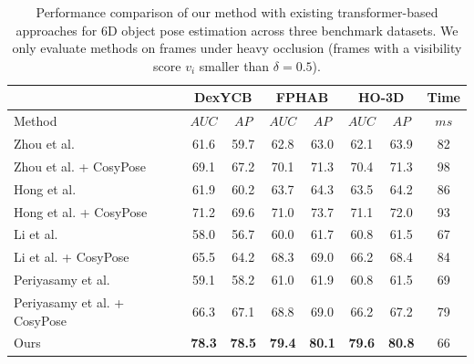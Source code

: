 \begin{table}[h]
\caption{Performance comparison of our method with existing transformer-based approaches for 6D object pose estimation across three benchmark datasets. We only evaluate methods on frames under heavy occlusion (frames with a visibility score \( v_i \) smaller than \( \delta = 0.5 \)).}
\label{tab:Transformer-Based}
\begin{center}
\begin{tabular}{l c c c c c c c} 
\hline
& \multicolumn{2}{c}{DexYCB} & \multicolumn{2}{c}{FPHAB} & \multicolumn{2}{c}{HO-3D} & Time \\
\hline
Method & $AUC$ & $AP$ & $AUC$ & $AP$ & $AUC$ & $AP$ & $ms$ \\  
\hline 

Zhou et al. \cite{zhou2023deep} & 61.6 & 59.7 & 62.8 & 63.0 & 62.1 & 63.9 & 82 \\

Zhou et al. \cite{zhou2023deep} + CosyPose \cite{labbe2020cosypose} & 69.1 & 67.2 & 70.1 & 71.3 & 70.4 & 71.3 & 98 \\

Hong et al. \cite{hong2024transformer} & 61.9 & 60.2 & 63.7 & 64.3 & 63.5 & 64.2 & 86 \\

Hong et al. \cite{hong2024transformer} + CosyPose \cite{labbe2020cosypose} & 71.2 & 69.6 & 71.0 & 73.7 & 71.1 & 72.0 & 93 \\

Li et al. \cite{li2023depth} & 58.0 & 56.7 & 60.0 & 61.7 & 60.8 & 61.5 & 67 \\

Li et al. \cite{li2023depth} + CosyPose \cite{labbe2020cosypose} & 65.5 & 64.2 & 68.3 & 69.0 & 66.2 & 68.4 & 84 \\

Periyasamy et al. \cite{periyasamy2023yolopose} & 59.1 & 58.2 & 61.0 & 61.9 & 60.8 & 61.5 & 69 \\

Periyasamy et al. \cite{periyasamy2023yolopose} + CosyPose \cite{labbe2020cosypose} & 66.3 & 67.1 & 68.8 & 69.0 & 66.2 & 67.2 & 79 \\

Ours & \textbf{78.3} & \textbf{78.5} & \textbf{79.4} & \textbf{80.1} & \textbf{79.6} & \textbf{80.8} & 66 \\
\hline
\end{tabular}
\end{center}
\end{table}

